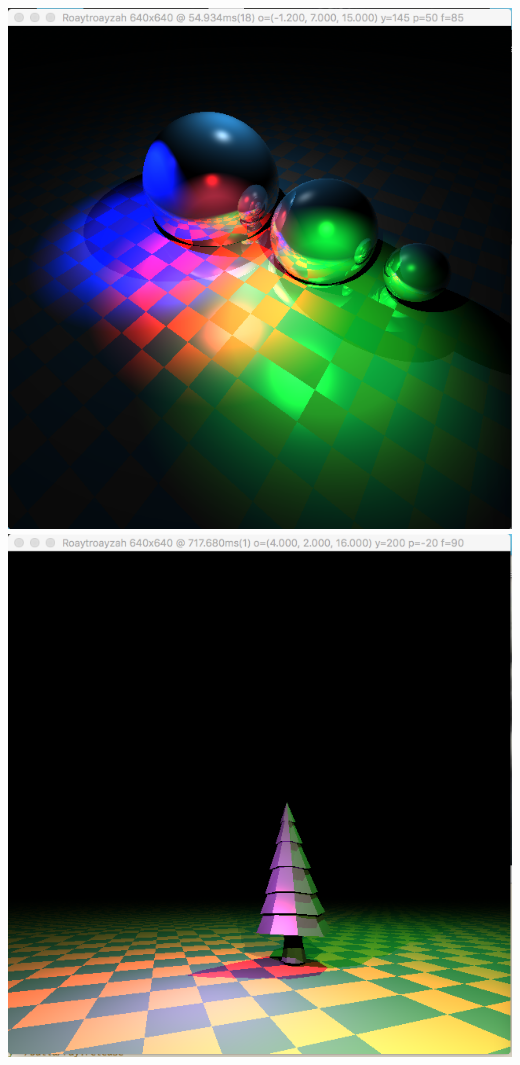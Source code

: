 \includegraphics[width=\textwidth]{img/colSpotlights3spheres}
\includegraphics[width=\textwidth]{img/colourLitTree}
